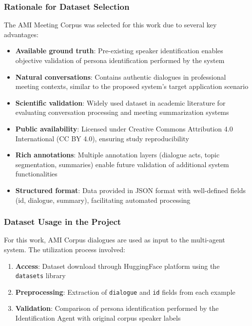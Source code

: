 \documentclass[12pt]{article}
\begin{document}
\subsubsection{Rationale for Dataset Selection}

The AMI Meeting Corpus was selected for this work due to several key advantages:

\begin{itemize}
    \item \textbf{Available ground truth}: Pre-existing speaker identification enables objective validation of persona identification performed by the system
    \item \textbf{Natural conversations}: Contains authentic dialogues in professional meeting contexts, similar to the proposed system's target application scenario
    \item \textbf{Scientific validation}: Widely used dataset in academic literature for evaluating conversation processing and meeting summarization systems
    \item \textbf{Public availability}: Licensed under Creative Commons Attribution 4.0 International (CC BY 4.0), ensuring study reproducibility
    \item \textbf{Rich annotations}: Multiple annotation layers (dialogue acts, topic segmentation, summaries) enable future validation of additional system functionalities
    \item \textbf{Structured format}: Data provided in JSON format with well-defined fields (id, dialogue, summary), facilitating automated processing
\end{itemize}

\subsubsection{Dataset Usage in the Project}

For this work, AMI Corpus dialogues are used as input to the multi-agent system. The utilization process involved:

\begin{enumerate}
    \item \textbf{Access}: Dataset download through HuggingFace platform using the \texttt{datasets} library
    \item \textbf{Preprocessing}: Extraction of \texttt{dialogue} and \texttt{id} fields from each example
    \item \textbf{Validation}: Comparison of persona identification performed by the Identification Agent with original corpus speaker labels
\end{enumerate}
\end{document}
